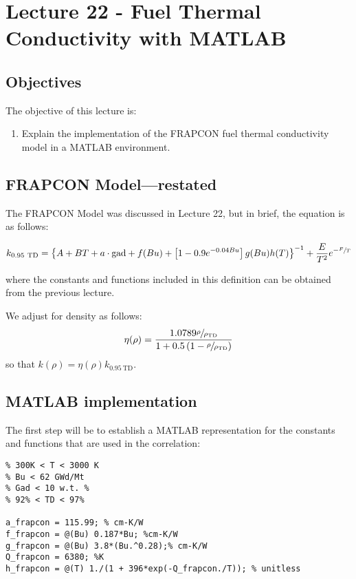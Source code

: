 \chapter{Lecture 22 - Fuel Thermal Conductivity with MATLAB}
\label{ch:ch22}
\section{Objectives}
The objective of this lecture is:
\begin{enumerate}
\item Explain the implementation of the FRAPCON fuel thermal conductivity model in a MATLAB environment.
\end{enumerate}

\section{FRAPCON Model---restated} 

The FRAPCON Model was discussed in Lecture 22, but in brief, the equation is as follows:

\begin{fullwidth}
\begin{equation*}
k_{0.95 \ \text{TD}} = \left\{A + BT + a \cdot \text{gad} + f(Bu) +  \left[1-0.9e^{-0.04 Bu} \right]g(Bu)h(T) \right\}^{-1} +  \frac{E}{T^2}e^{-\sfrac{F}{T}}
\end{equation*}
\end{fullwidth}
where the constants and functions included in this definition can be obtained from the previous lecture.

We adjust for density as follows:
\begin{equation*}
\eta(\rho) = \frac{1.0789 \sfrac{\rho}{\rho_{\text{TD}}}}{1 + 0.5\left(1 - \sfrac{\rho}{\rho_{\text{TD}}} \right)} 
\label{eq:FRAP_density2}
\end{equation*}
so that $k(\rho) = \eta(\rho)k_{0.95 \ \text{TD}}$.

\section{MATLAB implementation}
The first step will be to establish a MATLAB representation for the constants and functions that are used in the correlation:

\begin{lstlisting}[caption=Step 1.]
% range of applicability
% 300K < T < 3000 K
% Bu < 62 GWd/Mt
% Gad < 10 w.t. %
% 92% < TD < 97%

a_frapcon = 115.99; % cm-K/W
f_frapcon = @(Bu) 0.187*Bu; %cm-K/W
g_frapcon = @(Bu) 3.8*(Bu.^0.28);% cm-K/W
Q_frapcon = 6380; %K
h_frapcon = @(T) 1./(1 + 396*exp(-Q_frapcon./T)); % unitless
\end{lstlisting}

